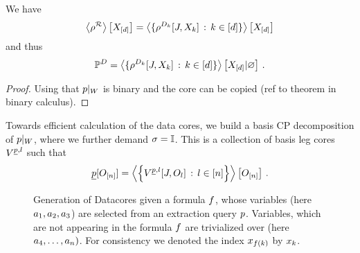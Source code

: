 \begin{theorem}	
	We have
		\[ 	\left\langle \rho^{\mathcal{R}}\right\rangle \left[ X_{[d]} \right] 
		= \left\langle \{\rho^{D_{k}}[J,X_{k}] \, : \, k\in[d]\}\right\rangle \left[ X_{[d]} \right] \]
	and thus 
		\[  \mathbb{P}^{D} = \left\langle \{\rho^{D_{k}}[J,X_{k}]  \, : \, k\in[d]\}\right\rangle \left[ X_{[d]} | \varnothing \right] \, . \]
\end{theorem}
\begin{proof}
	Using that ${p}|_{W}$ is binary and the core can be copied (ref to theorem in binary calculus).
\end{proof}

Towards efficient calculation of the data cores, we build a basis CP decomposition of ${p}|_{W}$, where we further demand $\sigma=\mathbb{I}$.
This is a collection of basis leg cores $V^{\underline{p},l}$ such that
\begin{align*}
	\underline{p}[O_{[n]}] = \left\langle  \left\{ V^{\underline{p},l}[J,O_{l}] \, : \, l\in[n] \right\} \right\rangle \left[ O_{[n]} \right] \, . 
\end{align*}



\begin{figure}[h]
\begin{center}
	
\end{center}
\caption{Generation of Datacores given a formula $f$, whose variables (here $a_{1},a_{2},a_{3}$) are selected from an extraction query $p$.
	Variables, which are not appearing in the formula $f$ are trivialized over (here $a_{4},\ldots,a_{n})$.
	For consistency we denoted the index $x_{f\left(k\right)}$ by $x_{k}$.}
	\label{fig:datacoreGeneration}
\end{figure}

